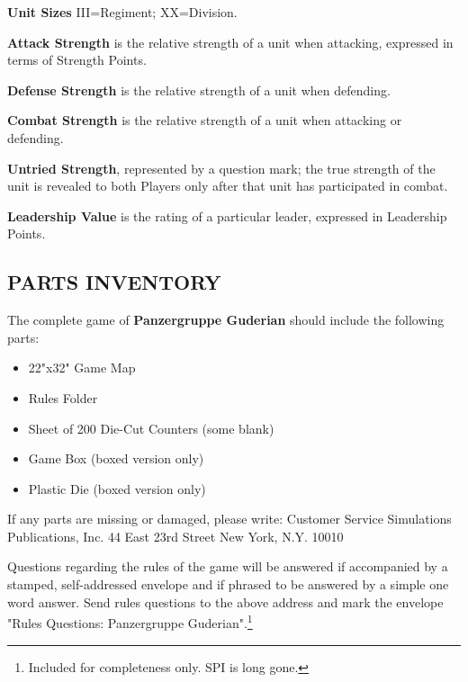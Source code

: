 \textbf{Unit Sizes}
III=Regiment; XX=Division.

\textbf{Attack Strength} is the relative strength of a unit when attacking, expressed in terms of Strength Points.

\textbf{Defense Strength} is the relative strength of a unit when defending.

\textbf{Combat Strength} is the relative strength of a unit when attacking or defending.

\textbf{Untried Strength}, represented by a question mark; the true strength of the unit is revealed to both Players only after that unit has participated in combat.

\textbf{Leadership Value} is the rating of a particular leader, expressed in Leadership Points.

\subsection{PARTS INVENTORY}

The complete game of \textbf{Panzergruppe Guderian} should include the following parts:

\begin{itemize}
  \setlength\itemsep{-0.9em}
  \item 22"x32" Game Map
  \item Rules Folder
  \item Sheet of 200 Die-Cut Counters (some blank)
  \item Game Box (boxed version only)
  \item Plastic Die (boxed version only)
\end{itemize}

If any parts are missing or damaged, please write:
Customer Service
Simulations Publications, Inc.
44 East 23rd Street
New York, N.Y. 10010

Questions regarding the rules of the game will be answered if accompanied by a stamped, self-addressed envelope and if phrased to be answered by a simple one word answer. Send rules questions to the above address and mark the envelope "Rules Questions: Panzergruppe Guderian".\footnote{Included for completeness only. SPI is long gone.}